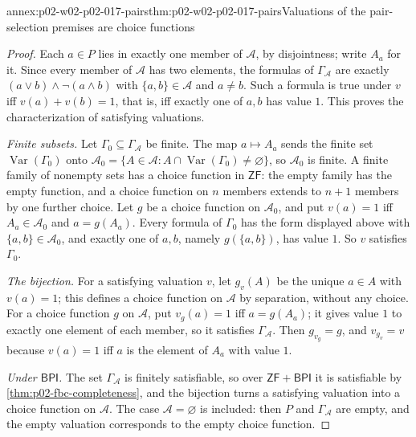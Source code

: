 \begin{annexitem}{annex:p02-w02-p02-017-pairs}{thm:p02-w02-p02-017-pairs}{Valuations of the pair-selection premises are choice functions}
\begin{proof}
Each \(a\in P\) lies in exactly one member of \(\mathcal A\), by
disjointness; write \(A_a\) for it.  Since every member of
\(\mathcal A\) has two elements, the formulas of \(\Gamma_{\mathcal A}\)
are exactly \((a\lor b)\land\neg(a\land b)\) with \(\{a,b\}\in\mathcal
A\) and \(a\ne b\).  Such a formula is true under \(v\) iff
\(v(a)+v(b)=1\), that is, iff exactly one of \(a,b\) has value \(1\).
This proves the characterization of satisfying valuations.

\emph{Finite subsets.}  Let \(\Gamma_0\subseteq\Gamma_{\mathcal A}\) be
finite.  The map \(a\mapsto A_a\) sends the finite set
\(\operatorname{Var}(\Gamma_0)\) onto
\(\mathcal A_0=\{A\in\mathcal A:A\cap\operatorname{Var}(\Gamma_0)\neq
\varnothing\}\), so \(\mathcal A_0\) is finite.  A finite family of
nonempty sets has a choice function in \(\mathsf{ZF}\): the empty family
has the empty function, and a choice function on \(n\) members extends
to \(n+1\) members by one further choice.  Let \(g\) be a choice
function on \(\mathcal A_0\), and put \(v(a)=1\) iff \(A_a\in\mathcal A_0\)
and \(a=g(A_a)\).  Every formula of \(\Gamma_0\) has the form displayed
above with \(\{a,b\}\in\mathcal A_0\), and exactly one of \(a,b\), namely
\(g(\{a,b\})\), has value \(1\).  So \(v\) satisfies \(\Gamma_0\).

\emph{The bijection.}  For a satisfying valuation \(v\), let \(g_v(A)\)
be the unique \(a\in A\) with \(v(a)=1\); this defines a choice function
on \(\mathcal A\) by separation, without any choice.  For a choice
function \(g\) on \(\mathcal A\), put \(v_g(a)=1\) iff \(a=g(A_a)\); it
gives value \(1\) to exactly one element of each member, so it satisfies
\(\Gamma_{\mathcal A}\).  Then \(g_{v_g}=g\), and \(v_{g_v}=v\) because
\(v(a)=1\) iff \(a\) is the element of \(A_a\) with value \(1\).

\emph{Under \(\mathsf{BPI}\).}  The set \(\Gamma_{\mathcal A}\) is
finitely satisfiable, so over \(\mathsf{ZF}+\mathsf{BPI}\) it is
satisfiable by \cref{thm:p02-fbc-completeness}, and the bijection turns a
satisfying valuation into a choice function on \(\mathcal A\).  The case
\(\mathcal A=\varnothing\) is included: then \(P\) and
\(\Gamma_{\mathcal A}\) are empty, and the empty valuation corresponds to
the empty choice function.
\end{proof}
\end{annexitem}
